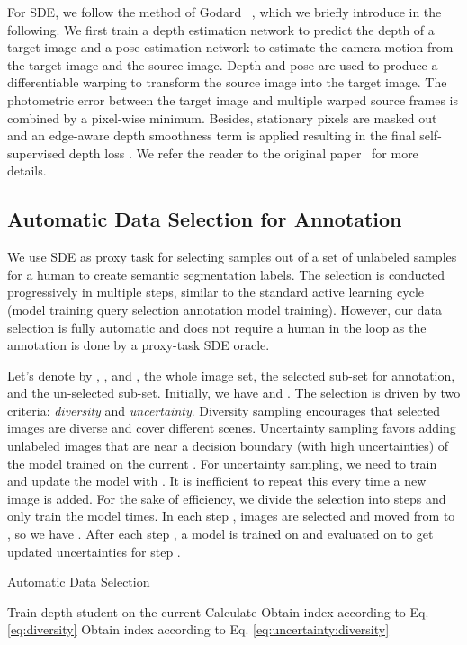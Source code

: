 \documentclass[final]{cvpr}
\begin{document}
For SDE, we follow the method of Godard \etal~\cite{godard2019digging}, which we briefly introduce in the following. We first train a depth estimation network  to predict the depth of a target image and a pose estimation network  to estimate the camera motion from the target image and the source image. Depth and pose are used to produce a differentiable warping to transform the source image into the target image. The photometric error between the target image and multiple warped source frames is combined by a pixel-wise minimum. Besides, stationary pixels are masked out and an edge-aware depth smoothness term is applied resulting in the final self-supervised depth loss . We refer the reader to the original paper~\cite{godard2019digging} for more details.


\subsection{Automatic Data Selection for Annotation}

We use SDE as proxy task for selecting  samples out of a set of  unlabeled samples for a human to create semantic segmentation labels.
The selection is conducted progressively in multiple steps, similar to the standard active learning cycle (model training  query selection  annotation  model training). However, our data selection is fully automatic and does not require a human in the loop as the annotation is done by a proxy-task SDE oracle.

Let's denote by , , and , the whole image set, the selected sub-set for annotation, and the un-selected sub-set.   
Initially, we have  and . The selection is driven by two criteria: \emph{diversity} and \emph{uncertainty}. Diversity sampling encourages that selected images are diverse and cover different scenes. Uncertainty sampling favors adding unlabeled images that are near a decision boundary (with high uncertainties) of the model trained on the current . 
For uncertainty sampling, we need to train and update the model with . It is inefficient to repeat this every time a new image is added. For the sake of efficiency, we divide the selection into  steps and only train the model  times. In each step ,  images are selected and moved from  to , so we have . After each step , a model is trained on  and evaluated on  to get updated uncertainties for step . 


\begin{algorithm}[tb]
\caption{Automatic Data Selection}
\label{alg:label_selection}
\begin{algorithmic}[1]
\STATE 
\STATE  
\STATE  
{}
\IF{ }
\STATE Train depth student  on the current 
\STATE Calculate 
\STATE 
 \ENDIF
 \IF{} 
     \STATE Obtain index  according to Eq. \ref{eq:diversity} 
 \ELSE 
      \STATE Obtain index  according to Eq. \ref{eq:uncertainty:diversity} 
 \ENDIF
    \STATE 
\ENDFOR
\end{algorithmic}
\end{algorithm}
\end{document}
